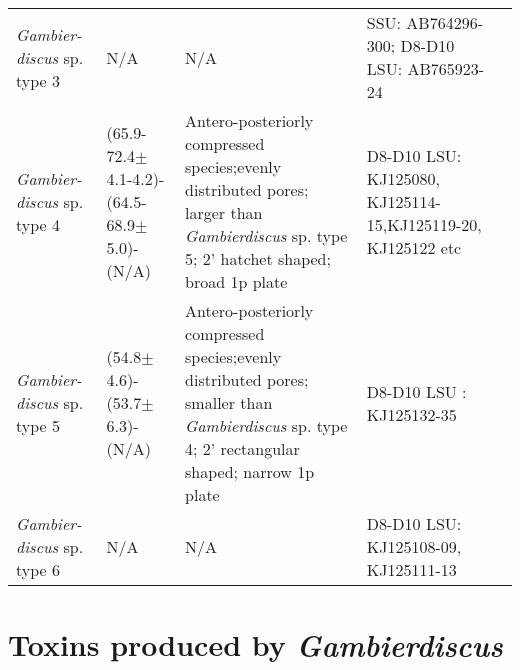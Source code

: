 \documentclass[12pt]{article}
\begin{document}
\begin{longtable}{  p{2cm}  p{2.7cm}  p{4.5cm}  p{3.1cm}  p{1cm}  }
 \emph{Gambier- discus} sp. type 3 & N/A & N/A & SSU: AB764296-300; D8-D10 LSU: AB765923-24& \cite{nishimura2013genetic} \\
 \emph{Gambier- discus} sp. type 4  & (65.9-72.4$\pm$4.1-4.2)-(64.5-68.9$\pm$5.0)-(N/A) & Antero-posteriorly compressed species;evenly distributed pores; larger than \emph{Gambierdiscus} sp. type 5; 2' hatchet shaped; broad 1p plate & D8-D10 LSU: KJ125080, KJ125114-15,KJ125119-20, KJ125122 etc  & \cite{xu2014distribution} \\
 \emph{Gambier- discus} sp. type 5  & (54.8$\pm$4.6)-(53.7$\pm$6.3)- (N/A) & Antero-posteriorly compressed species;evenly distributed pores; smaller than \emph{Gambierdiscus} sp. type 4; 2' rectangular shaped; narrow 1p plate & D8-D10 LSU : KJ125132-35 & \cite{xu2014distribution} \\
 \emph{Gambier- discus} sp. type 6 & N/A & N/A & D8-D10 LSU: KJ125108-09, KJ125111-13 & \cite{xu2014distribution} \\
\end{longtable}
\FloatBarrier

\section{Toxins produced by \emph{Gambierdiscus}}

\end{document}
